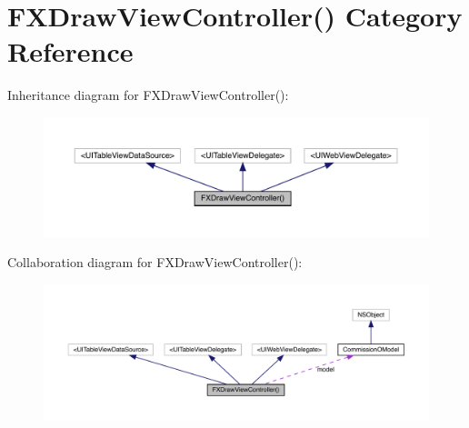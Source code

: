 \hypertarget{category_f_x_draw_view_controller_07_08}{}\section{F\+X\+Draw\+View\+Controller() Category Reference}
\label{category_f_x_draw_view_controller_07_08}


Inheritance diagram for F\+X\+Draw\+View\+Controller()\+:\nopagebreak
\begin{figure}[H]
\begin{center}
\leavevmode
\includegraphics[width=350pt]{category_f_x_draw_view_controller_07_08__inherit__graph}
\end{center}
\end{figure}


Collaboration diagram for F\+X\+Draw\+View\+Controller()\+:\nopagebreak
\begin{figure}[H]
\begin{center}
\leavevmode
\includegraphics[width=350pt]{category_f_x_draw_view_controller_07_08__coll__graph}
\end{center}
\end{figure}
